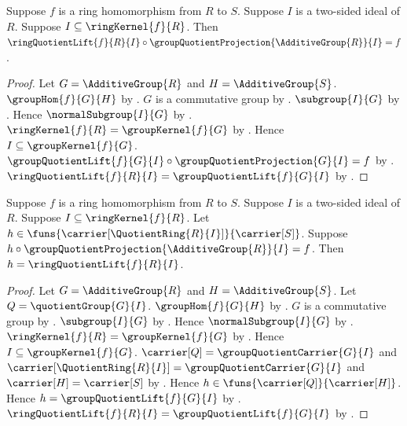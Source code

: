 \begin{theorem}\label{ring_quotient_lift_factorization}
    Suppose $f$ is a ring homomorphism from $R$ to $S$.
    Suppose $I$ is a two-sided ideal of $R$.
    Suppose $I\subseteq\ringKernel{f}{R}$.
    Then
        $\ringQuotientLift{f}{R}{I}\circ
            \groupQuotientProjection{\AdditiveGroup{R}}{I}=f$.
\end{theorem}
\begin{proof}
    Let $G=\AdditiveGroup{R}$ and $H=\AdditiveGroup{S}$.
    $\groupHom{f}{G}{H}$ by
        .
    $G$ is a commutative group by
        .
    $\subgroup{I}{G}$ by
        .
    Hence $\normalSubgroup{I}{G}$ by
        .
    $\ringKernel{f}{R}=\groupKernel{f}{G}$ by .
    Hence $I\subseteq\groupKernel{f}{G}$.
    $\groupQuotientLift{f}{G}{I}\circ
        \groupQuotientProjection{G}{I}=f$ by
        .
    $\ringQuotientLift{f}{R}{I}=\groupQuotientLift{f}{G}{I}$ by
        .
\end{proof}

\begin{theorem}\label{ring_quotient_lift_unique}
    Suppose $f$ is a ring homomorphism from $R$ to $S$.
    Suppose $I$ is a two-sided ideal of $R$.
    Suppose $I\subseteq\ringKernel{f}{R}$.
    Let $h\in\funs{\carrier[\QuotientRing{R}{I}]}{\carrier[S]}$.
    Suppose
        $h\circ\groupQuotientProjection{\AdditiveGroup{R}}{I}=f$.
    Then $h=\ringQuotientLift{f}{R}{I}$.
\end{theorem}
\begin{proof}
    Let $G=\AdditiveGroup{R}$ and $H=\AdditiveGroup{S}$.
    Let $Q=\quotientGroup{G}{I}$.
    $\groupHom{f}{G}{H}$ by
        .
    $G$ is a commutative group by
        .
    $\subgroup{I}{G}$ by
        .
    Hence $\normalSubgroup{I}{G}$ by
        .
    $\ringKernel{f}{R}=\groupKernel{f}{G}$ by .
    Hence $I\subseteq\groupKernel{f}{G}$.
    $\carrier[Q]=\groupQuotientCarrier{G}{I}$ and
        $\carrier[\QuotientRing{R}{I}]=\groupQuotientCarrier{G}{I}$ and
        $\carrier[H]=\carrier[S]$ by
        .
    Hence $h\in\funs{\carrier[Q]}{\carrier[H]}$.
    Hence $h=\groupQuotientLift{f}{G}{I}$ by
        .
    $\ringQuotientLift{f}{R}{I}=\groupQuotientLift{f}{G}{I}$ by
        .
\end{proof}

